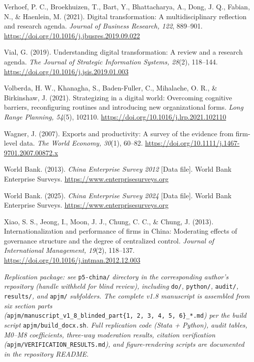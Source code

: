 \documentclass[
  12pt,a4paper]{article}
\begin{document}
Verhoef, P. C., Broekhuizen, T., Bart, Y., Bhattacharya, A., Dong, J.
Q., Fabian, N., \& Haenlein, M. (2021). Digital transformation: A
multidisciplinary reflection and research agenda. \emph{Journal of
Business Research, 122}, 889--901.
\url{https://doi.org/10.1016/j.jbusres.2019.09.022}

Vial, G. (2019). Understanding digital transformation: A review and a
research agenda. \emph{The Journal of Strategic Information Systems,
28}(2), 118--144. \url{https://doi.org/10.1016/j.jsis.2019.01.003}

Volberda, H. W., Khanagha, S., Baden-Fuller, C., Mihalache, O. R., \&
Birkinshaw, J. (2021). Strategizing in a digital world: Overcoming
cognitive barriers, reconfiguring routines and introducing new
organizational forms. \emph{Long Range Planning, 54}(5), 102110.
\url{https://doi.org/10.1016/j.lrp.2021.102110}

Wagner, J. (2007). Exports and productivity: A survey of the evidence
from firm-level data. \emph{The World Economy, 30}(1), 60--82.
\url{https://doi.org/10.1111/j.1467-9701.2007.00872.x}

World Bank. (2013). \emph{China Enterprise Survey 2012} {[}Data file{]}.
World Bank Enterprise Surveys. \url{https://www.enterprisesurveys.org}

World Bank. (2025). \emph{China Enterprise Survey 2024} {[}Data file{]}.
World Bank Enterprise Surveys. \url{https://www.enterprisesurveys.org}

Xiao, S. S., Jeong, I., Moon, J. J., Chung, C. C., \& Chung, J. (2013).
Internationalization and performance of firms in China: Moderating
effects of governance structure and the degree of centralized control.
\emph{Journal of International Management, 19}(2), 118--137.
\url{https://doi.org/10.1016/j.intman.2012.12.003}

\emph{Replication package: see} \texttt{p5-china/} \emph{directory in
the corresponding author's repository (handle withheld for blind
review), including} \texttt{do/}\emph{, } \texttt{python/}\emph{, }
\texttt{audit/}\emph{, } \texttt{results/}\emph{, and} \texttt{apjm/}
\emph{subfolders. The complete v1.8 manuscript is assembled from six
section parts
(}\texttt{apjm/manuscript\_v1\_8\_blinded\_part\{1,\ 2,\ 3,\ 4,\ 5,\ 6\}\_*.md}\emph{)
per the build script} \texttt{apjm/build\_docx.sh}\emph{. Full
replication code (Stata + Python), audit tables, M0--M8 coefficients,
three-way moderation results, citation verification
(}\texttt{apjm/VERIFICATION\_RESULTS.md}\emph{), and figure-rendering
scripts are documented in the repository README.}
\end{document}
